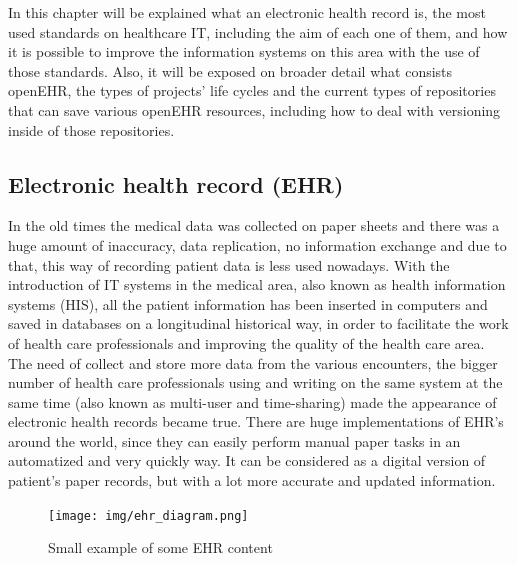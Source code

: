 \documentclass[mim_thesis.tex]{subfiles}
\begin{document}
In this chapter will be explained what an electronic health record is, the most used standards on healthcare IT, including the aim of each one of them, and how it is possible to improve the information systems on this area with the use of those standards. Also, it will be exposed on broader detail what consists openEHR, the types of projects’ life cycles and the current types of repositories that can save various openEHR resources, including how to deal with versioning inside of those repositories.

\subsection{Electronic health record (EHR)}
 
In the old times the medical data was collected on paper sheets and there was a huge amount of inaccuracy, data replication, no information exchange and due to that, this way of recording patient data is less used nowadays. With the introduction of IT systems in the medical area, also known as health information systems (HIS), all the patient information has been inserted in computers and saved in databases on a longitudinal historical way, in order to facilitate the work of health care professionals and improving the quality of the health care area. The need of collect and store more data from the various encounters, the bigger number of health care professionals using and writing on the same system at the same time (also known as multi-user and time-sharing) made the appearance of electronic health records became true. There are huge implementations of EHR's around the world, since they can easily perform manual paper tasks in an automatized and very quickly way. It can be considered as a digital version of patient’s paper records, but with a lot more accurate and updated information.

\begin{figure}[H]
	\centering
    \texttt{[image: img/ehr\_diagram.png]}
	\caption{ Small example of some EHR content}
	\label{fig:ehr_diagram}
\end{figure}
\end{document}
